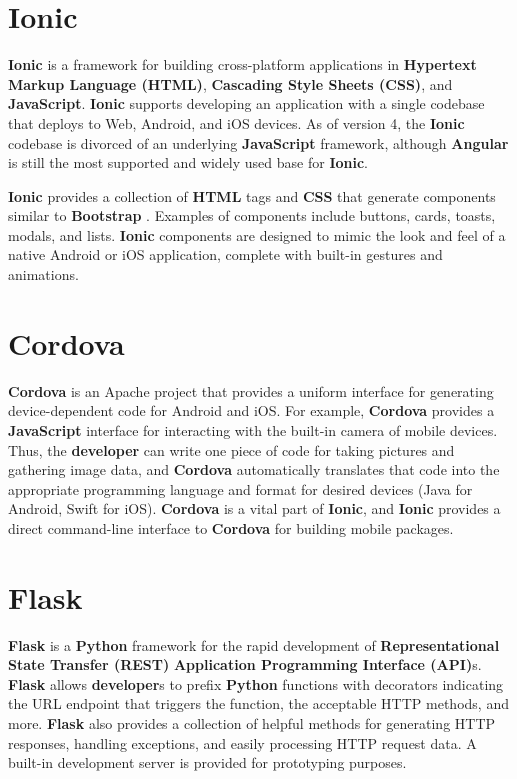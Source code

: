 \documentclass[12pt]{report}
\begin{document}
    \section{Ionic}

\textbf{Ionic} \cite{ionic} is a framework for building cross-platform
applications in \textbf{Hypertext Markup Language (HTML)}, \textbf{Cascading
Style Sheets (CSS)}, and \textbf{JavaScript}. \textbf{Ionic} supports developing
an application with a single codebase that deploys to Web, Android, and iOS
devices. As of version 4, the \textbf{Ionic} codebase is divorced of an
underlying \textbf{JavaScript} framework, although \textbf{Angular} is still the
most supported and widely used base for \textbf{Ionic}.

\textbf{Ionic} provides a collection of \textbf{HTML} tags and \textbf{CSS} that
generate components similar to \textbf{Bootstrap} \cite{bootstrap}.  Examples of
components include buttons, cards, toasts, modals, and lists.  \textbf{Ionic}
components are designed to mimic the look and feel of a native Android or iOS
application, complete with built-in gestures and animations.
    
    \section{Cordova}

\textbf{Cordova} \cite{cordova} is an Apache project that provides a uniform
interface for generating device-dependent code for Android and iOS. For example,
\textbf{Cordova} provides a \textbf{JavaScript} interface for interacting with
the built-in camera of mobile devices. Thus, the \textbf{developer} can write
one piece of code for taking pictures and gathering image data, and
\textbf{Cordova} automatically translates that code into the appropriate
programming language and format for desired devices (Java for Android, Swift for
iOS). \textbf{Cordova} is a vital part of \textbf{Ionic}, and \textbf{Ionic}
provides a direct command-line interface to \textbf{Cordova} for building mobile
packages.
    
    \section{Flask}

\textbf{Flask} \cite{flask} is a \textbf{Python} framework for the rapid
development of \textbf{Representational State Transfer (REST)}
\textbf{Application Programming Interface (API)}s. \textbf{Flask} allows
\textbf{developer}s to prefix \textbf{Python} functions with decorators
indicating the URL endpoint that triggers the function, the acceptable HTTP
methods, and more. \textbf{Flask} also provides a collection of helpful methods
for generating HTTP responses, handling exceptions, and easily processing HTTP
request data. A built-in development server is provided for prototyping
purposes.
    
\end{document}
